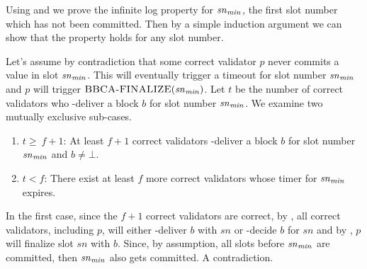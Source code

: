 \label{lemma:causality}

Using  and  we prove the infinite log property for $\mathit{sn}_{\mathit{min}}$, the first slot number which has not been committed.
Then by a simple induction argument we can show that the property holds for any slot number.

Let's assume by contradiction that some correct validator $p$ never commits a value in slot $\mathit{sn}_{\mathit{min}}$.
This will eventually trigger a timeout for slot number $\mathit{sn}_{\mathit{min}}$ and $p$ will trigger $\textsc{BBCA-FINALIZE}(\mathit{sn}_{\mathit{min}})$.
Let $t$ be the number of correct validators who \primitivesmall-deliver a block $b$ for slot number $\mathit{sn}_{\mathit{min}}$.
We examine two mutually exclusive sub-cases.
\begin{enumerate}
	\item $t\ge\ f+1$: At least $f+1$ correct validators \primitivesmall-deliver a block $b$ for slot number $\mathit{sn}_{\mathit{min}}$ and $b\neq\bot$.
	\item $t<f$: There exist at least $f$ more correct validators whose timer for $\mathit{sn}_{\mathit{min}}$ expires.
\end{enumerate}

In the first case, since the $f+1$ correct validators are correct, by , all correct validators, including $p$, will either \primitivesmall-deliver $b$ with $sn$ or \vbc-decide $b$ for $sn$ and by , $p$ will finalize slot $sn$ with $b$.
Since, by assumption, all slots before $\mathit{sn}_{\mathit{min}}$ are committed, then $\mathit{sn}_{\mathit{min}}$ also gets committed.
 A contradiction.


